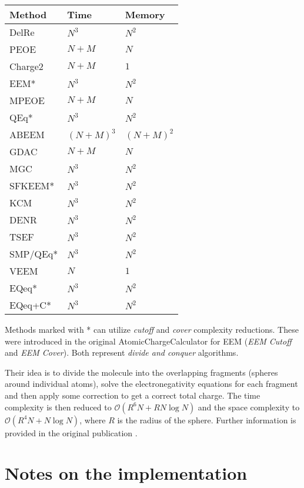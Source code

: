 \documentclass[oneside]{memoir}
\begin{document}
\begin{center}
\begin{tabular}{lll}
\toprule
Method & Time & Memory\\
\midrule
DelRe & $N^3$ & $N^2$\\
PEOE  & $N + M$ & $N$\\
Charge2 & $N + M$ & $1$\\
EEM* & $N^3$ & $N^2$\\
MPEOE & $N + M$& $N$\\
QEq* & $N^3$ & $N^2$ \\
ABEEM & $(N + M)^3$ & $(N + M)^2$\\
GDAC & $N + M$ & $N$\\
MGC & $N^3$& $N^2$\\
SFKEEM* & $N^3$& $N^2$\\
KCM & $N^3$ & $N^2$\\
DENR & $N^3$& $N^2$\\
TSEF & $N^3$ & $N^2$ \\
SMP/QEq* & $N^3$& $N^2$\\
VEEM & $N$& $1$ \\
EQeq* & $N^3$ & $N^2$ \\
EQeq+C* & $N^3$ & $N^2$\\
\bottomrule
\end{tabular}
\end{center}

\bigskip

Methods marked with * can utilize \textit{cutoff} and \textit{cover} complexity reductions. These were introduced in the original AtomicChargeCalculator for EEM (\textit{EEM Cutoff} and \textit{EEM Cover}). Both represent \textit{divide and conquer} algorithms.

Their idea is to divide the molecule into the overlapping fragments (spheres around individual atoms), solve the electronegativity equations for each fragment and then apply some correction to get a correct total charge. The time complexity is then reduced to ${\mathcal O}(R^6N+RN\log{N})$ and the space complexity to ${\mathcal O}(R^4N+N\log{N})$, where $R$ is the radius of the sphere. Further information is provided in the original publication \cite{Ionescu2015}.

\chapter*{Notes on the implementation}
\end{document}
